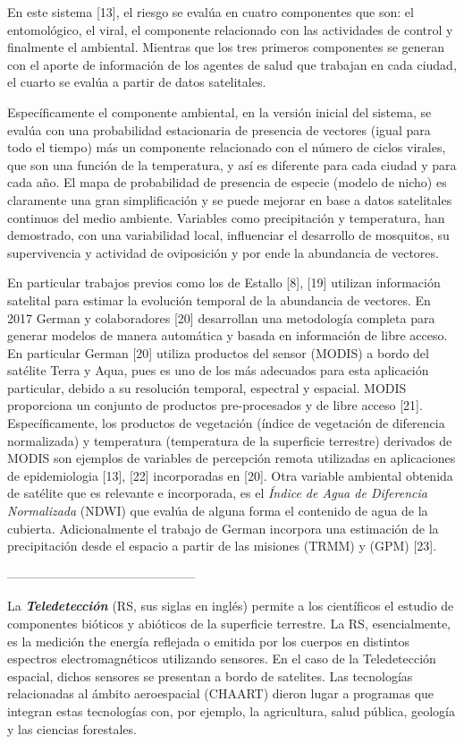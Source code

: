En este sistema [13], el riesgo se evalúa en cuatro componentes que son: el
entomológico, el viral, el componente relacionado con las actividades de
control y finalmente el ambiental. Mientras que los tres primeros componentes
se generan con el aporte de información de los agentes de salud que trabajan en cada
ciudad, el cuarto se evalúa a partir de datos satelitales.

Específicamente el componente ambiental, en la versión inicial del sistema, se
evalúa con una probabilidad estacionaria de presencia de vectores (igual para
todo el tiempo) más un componente relacionado con el número de ciclos virales,
que son una función de la temperatura, y así es diferente para cada ciudad y
para cada año. El mapa de probabilidad de presencia de especie (modelo de nicho)
es claramente una gran simplificación y se puede mejorar en base a datos
satelitales continuos del medio ambiente. Variables como precipitación y
temperatura, han demostrado, con una variabilidad local, influenciar el
desarrollo de mosquitos, su supervivencia y actividad de oviposición y por ende
la abundancia de vectores.

En particular trabajos previos como los de Estallo [8], [19] utilizan información
satelital para estimar la evolución temporal de la abundancia de vectores.
En 2017 German y colaboradores [20] desarrollan una metodología completa
para generar modelos de manera automática y basada en información de libre
acceso. En particular German [20] utiliza productos del sensor (MODIS) a bordo
del satélite Terra y Aqua, pues es uno de los más adecuados para esta
aplicación particular, debido a su resolución temporal, espectral y espacial.
MODIS proporciona un conjunto de productos pre-procesados y de libre acceso [21].
Específicamente, los productos de vegetación (índice de vegetación de diferencia
normalizada) y temperatura (temperatura de la superficie terrestre) derivados
de MODIS son ejemplos de variables de percepción remota utilizadas
en aplicaciones de epidemiologia [13], [22] incorporadas en [20]. Otra variable
ambiental obtenida de satélite que es relevante e incorporada, es el
\textit{Índice de Agua de Diferencia Normalizada} (NDWI) que evalúa de alguna
forma el contenido de agua de la cubierta. Adicionalmente el trabajo de German
incorpora una estimación de la precipitación desde el espacio a partir de las
misiones (TRMM) y (GPM) [23].

---------------------------------------------

La \textbf{\textit{Teledetección}} (RS, sus siglas en inglés) permite a los científicos el
estudio de componentes bióticos y abióticos de la superficie terrestre.
La RS, esencialmente, es la medición the energía reflejada o emitida por los
cuerpos en distintos espectros electromagnéticos utilizando sensores.
En el caso de la Teledetección espacial, dichos sensores se presentan a bordo
de satelites.
Las tecnologías relacionadas al ámbito aeroespacial (CHAART) dieron lugar a programas
que integran estas tecnologías con, por ejemplo, la agricultura, salud pública,
geología y las ciencias forestales.

